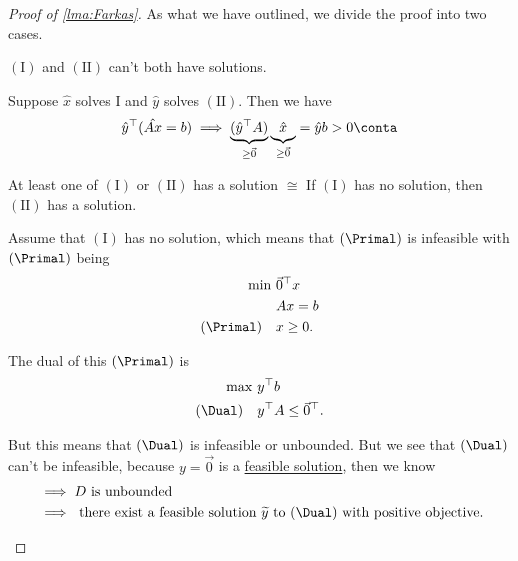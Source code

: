 \begin{proof}[Proof of \autoref{lma:Farkas}]
	As what we have outlined, we divide the proof into two cases.
	\begin{claim}
		\((\mathrm{I})\) and \((\mathrm{II})\) can't both have solutions.
	\end{claim}
	\begin{explanation}
		Suppose \(\hat{x}\) solves I and \(\hat{y}\) solves \((\mathrm{II})\). Then we have
		\[
			\hat{y}^{\top}(\hat{Ax} = b) \implies \underbrace{(\hat{y}^{\top} A)}_{\geq  \vec{0}}\underbrace{\vphantom{\hat{y}^{\top}}\hat{x}}_{\geq  \vec{0}} = \hat{y} b > 0\conta
		\]
	\end{explanation}
	\begin{claim}
		At least one of \((\mathrm{I})\) or \((\mathrm{II})\) has a solution \(\cong\) If \((\mathrm{I})\) has no solution, then \((\mathrm{II})\) has a solution.
	\end{claim}
	\begin{explanation}
		Assume that \((\mathrm{I})\) has no solution, which means that \((\Primal)\) is infeasible with \((\Primal)\) being
		\[
			\begin{aligned}
				\min~          & \vec{0}^{\top} x \\
				               & Ax = b           \\
				(\Primal)\quad & x\geq 0.
			\end{aligned}
		\]

		The dual of this \((\Primal)\) is
		\[
			\begin{aligned}
				\max~        & y^{\top}b                       \\
				(\Dual)\quad & y^{\top} A \leq \vec{0}^{\top}.
			\end{aligned}
		\]

		But this means that \((\Dual)\) is infeasible or unbounded. But we see that \((\Dual)\) can't be infeasible, because \(y = \vec{0}\) is a \hyperref[def:feasible-solution]{feasible solution}, then we know
		\[
			\begin{split}
				 & \implies D \text{ is unbounded}                                                                            \\
				 & \implies \text{ there exist a feasible solution \(\widetilde{y}\) to \((\Dual)\) with positive objective}.
			\end{split}
		\]
	\end{explanation}
\end{proof}

